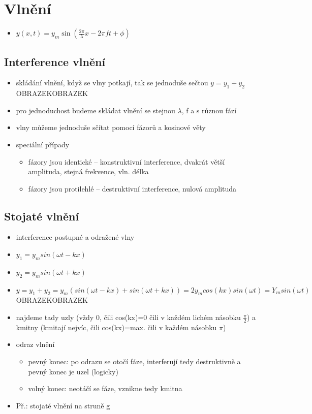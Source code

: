 \documentclass{article}
\begin{document}
\section{Vlnění}
\begin{itemize}
  \item $y(x, t) = y_m \sin\left(\frac{2\pi}{\lambda} x - 2\pi f t + \phi\right)$
\end{itemize}

\subsection{Interference vlnění}
\begin{itemize}
  \item skládání vlnění, když se vlny potkají, tak se jednoduše sečtou $y = y_1 + y_2$ OBRAZEKOBRAZEK
  \item pro jednoduchost budeme skládat vlnění se stejnou $\lambda$, f a s různou fází
  \item vlny můžeme jednoduše sčítat pomocí fázorů a kosinové věty
  \item speciální případy
  \begin{itemize}
    \item fázory jsou identické -- konstruktivní interference, dvakrát větší amplituda, stejná frekvence, vln. délka
    \item fázory jsou protilehlé -- destruktivní interference, nulová amplituda
  \end{itemize}
\end{itemize}

\subsection{Stojaté vlnění}
\begin{itemize}
  \item interference postupné a odražené vlny
  \item $y_1 = y_m sin(\omega t - kx)$
  \item $y_2 = y_m sin(\omega t + kx)$
  \item $y = y_1 + y_2 = y_m(sin(\omega t - kx)+sin(\omega t + kx)) = 2y_m cos(kx)sin(\omega t) = Y_m sin(\omega t)$ OBRAZEKOBRAZEK
  \item najdeme tady uzly (vždy 0, čili cos(kx)=0 čili v každém lichém násobku $\frac{\pi}{2}$) a kmitny (kmitají nejvíc, čili cos(kx)=max. čili v každém násobku $\pi$)
  \item odraz vlnění
  \begin{itemize}
    \item pevný konec: po odrazu se otočí fáze, interferují tedy destruktivně a pevný konec je uzel (logicky)
    \item volný konec: neotáčí se fáze, vznikne tedy kmitna
  \end{itemize}
  \item Př.: stojaté vlnění na struně g
\end{itemize}
\end{document}

